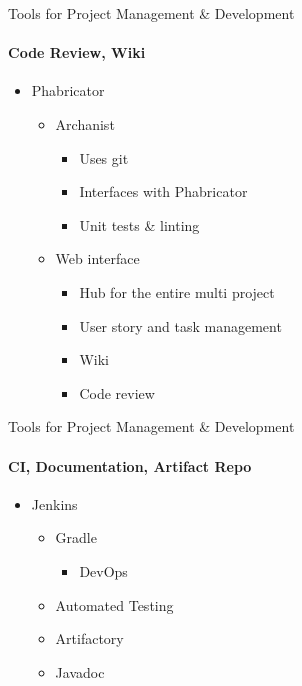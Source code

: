 \begin{frame}[t]{Tools for Project Management \& Development}\framesubtitle{Code Review, Wiki}
    \begin{itemize}
        \item Phabricator
        \begin{itemize}
            \item Archanist
            \begin{itemize}
                \item Uses git
                \item Interfaces with Phabricator
                \item Unit tests \& linting
            \end{itemize}
            \item Web interface
            \begin{itemize}
                \item Hub for the entire multi project
                \item User story and task management
                \item Wiki
                \item Code review
            \end{itemize}
        \end{itemize}
    \end{itemize}
\end{frame}
\begin{frame}[t]{Tools for Project Management \& Development}\framesubtitle{CI, Documentation, Artifact Repo}
    \begin{itemize}
        \item Jenkins
        \begin{itemize}
            \item Gradle
            \begin{itemize}
                \item DevOps
            \end{itemize}
            \item Automated Testing
            \item Artifactory
            \item Javadoc
        \end{itemize}
    \end{itemize}
\end{frame}
